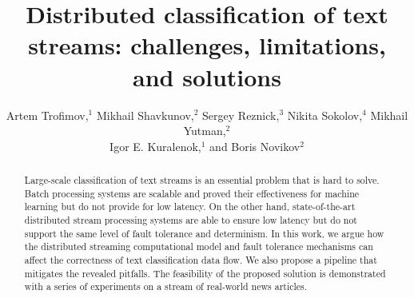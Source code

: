 \documentclass[sigconf]{acmart}
\theoremstyle{remark}
\begin{document}

\title {Distributed classification of text streams: challenges, limitations, and solutions}

\author{Artem Trofimov,$^ {1}$    Mikhail Shavkunov,$^2$    Sergey Reznick,$^3$     Nikita Sokolov,$^{4}$   Mikhail Yutman,$^2$ \\   Igor E. Kuralenok,$^1$    and  Boris Novikov$^ {2}$ }

\begin{abstract}

Large-scale classification of text streams is an essential problem that is hard to solve. Batch processing systems are scalable and proved their effectiveness for machine learning but do not provide for low latency. On the other hand, state-of-the-art distributed stream processing systems are able to ensure low latency but do not support the same level of fault tolerance and determinism. In this work, we argue how the distributed streaming computational model and fault tolerance mechanisms can affect the correctness of text classification data flow. We also propose a pipeline that mitigates the revealed pitfalls. The feasibility of the proposed solution is demonstrated with a series of experiments on a stream of real-world news articles.

\end{abstract}


\maketitle

\thispagestyle{empty}
\end{document}

